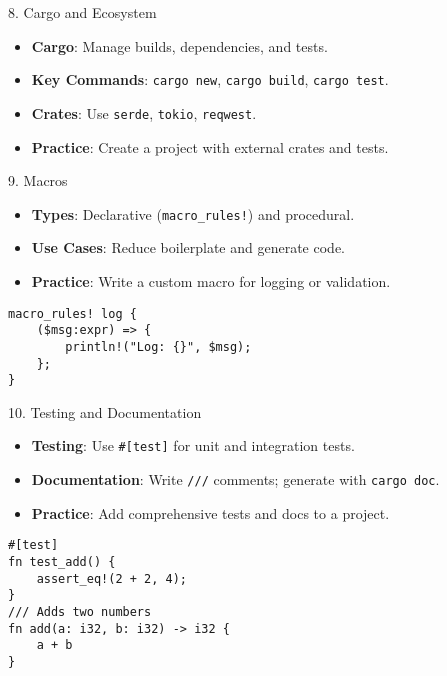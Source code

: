 \documentclass[10pt]{beamer}
\begin{document}
\begin{frame}{8. Cargo and Ecosystem}
    \begin{itemize}
        \item \textbf{Cargo}: Manage builds, dependencies, and tests.
        \item \textbf{Key Commands}: \texttt{cargo new}, \texttt{cargo build}, \texttt{cargo test}.
        \item \textbf{Crates}: Use \texttt{serde}, \texttt{tokio}, \texttt{reqwest}.
        \item \textbf{Practice}: Create a project with external crates and tests.
    \end{itemize}
\end{frame}

\begin{frame}{9. Macros}
    \begin{itemize}
        \item \textbf{Types}: Declarative (\texttt{macro\_rules!}) and procedural.
        \item \textbf{Use Cases}: Reduce boilerplate and generate code.
        \item \textbf{Practice}: Write a custom macro for logging or validation.
    \end{itemize}
    \begin{lstlisting}
macro_rules! log {
    ($msg:expr) => {
        println!("Log: {}", $msg);
    };
}
    \end{lstlisting}
\end{frame}

\begin{frame}{10. Testing and Documentation}
    \begin{itemize}
        \item \textbf{Testing}: Use \texttt{\#[test]} for unit and integration tests.
        \item \textbf{Documentation}: Write \texttt{///} comments; generate with \texttt{cargo doc}.
        \item \textbf{Practice}: Add comprehensive tests and docs to a project.
    \end{itemize}
    \begin{lstlisting}
#[test]
fn test_add() {
    assert_eq!(2 + 2, 4);
}
/// Adds two numbers
fn add(a: i32, b: i32) -> i32 {
    a + b
}
    \end{lstlisting}
\end{frame}
\end{document}

